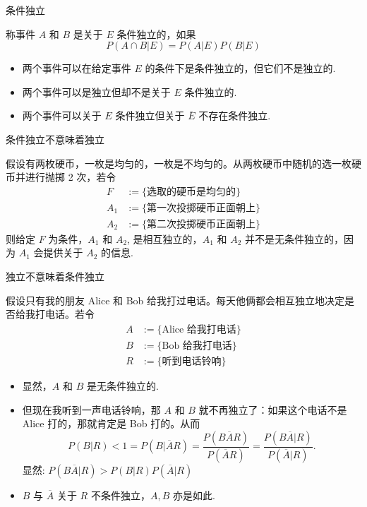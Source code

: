 \documentclass[Prob-All.tex]{subfiles}
\begin{document}
\begin{frame}{条件独立}
\begin{defi}
称事件 $A$ 和 $B$ 是关于 $E$ 条件独立的，如果 $$P (A\cap B|E)=P (A|E) P (B|E)$$
\end{defi}
\pause
\begin{itemize}[<+-|alert@+>]
\item 两个事件可以在给定事件 $E$ 的条件下是条件独立的，但它们不是独立的.
\item 两个事件可以是独立但却不是关于 $E$ 条件独立的.
\item 两个事件可以关于 $E$ 条件独立但关于 $\overline{E}$ 不存在条件独立.
\end{itemize}
\end{frame}

\begin{frame}{条件独立不意味着独立}
\begin{exam}
假设有两枚硬币，一枚是均匀的，一枚是不均匀的。从两枚硬币中随机的选一枚硬币并进行抛掷 2 次，若令
\begin{align*}
  F &:=\{\mbox{选取的硬币是均匀的}\}\\
   A_{1}&:= \{\mbox{第一次投掷硬币正面朝上}\}\\
   A_{2}&:= \{\mbox{第二次投掷硬币正面朝上}\}
\end{align*}
则给定 $F$ 为条件，$A_1$ 和 $A_2$, 是相互独立的，$A_1$ 和 $A_2$ 并不是无条件独立的，因为 $A_1$ 会提供关于 $A_2$ 的信息.
\end{exam}
\end{frame}

\begin{frame}{独立不意味着条件独立}
\begin{exam}
假设只有我的朋友 Alice 和 Bob 给我打过电话。每天他俩都会相互独立地决定是否给我打电话。若令
\begin{align*}
	 A&:= \{\mbox{Alice 给我打电话}\}\\
	 B&:= \{\mbox{Bob 给我打电话}\}\\
     R&:=\{\mbox{听到电话铃响}\}
  \end{align*}
  \pause
  \begin{itemize}[<+-|alert@+>]
  \item 显然，$A$ 和 $B$ 是无条件独立的.
  \item 但现在我听到一声电话铃响，那 $A$ 和 $B$ 就不再独立了：如果这个电话不是 Alice 打的，那就肯定是 Bob 打的。从而 \pause
  $$P(B|R)<1=P(B|\overline{A}R)= \frac{P(B\overline{A}R)}{P(\overline{A}R)}= \frac{P(B\overline{A}|R)}{P(\overline{A}|R)}.$$
  显然: $P (B\overline{A}|R)>P (B|R) P (\overline{A}|R)$
  \item $B$ 与 $\overline{A}$ 关于 $R$ 不条件独立，$A,B$ 亦是如此.
  \end{itemize}

\end{exam}
\end{frame}
\end{document}
